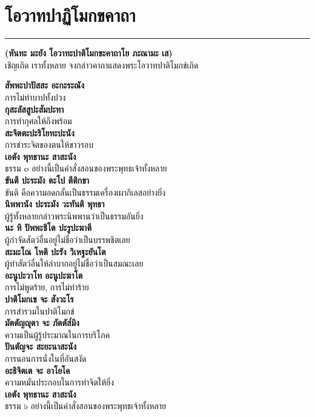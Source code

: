 \documentclass[12pt]{article}
\begin{document}
\section{โอวาทปาฏิโมกขคาถา}
\hrule
\begin{center}
\textbf{(หันทะ มะยัง โอวาทะปาติโมกขะคาถาโย ภะณามะ เส)}\\
เชิญเถิด เราทั้งหลาย จงกล่าวคาถาแสดงพระโอวาทปาติโมกข์เถิด
\end{center}
\textbf{สัพพะปาปัสสะ อะกะระณัง}\\
\indent การไม่ทำบาปทั้งปวง\\
\textbf{กุสะลัสสูปะสัมปะทา}\\
\indent การทำกุศลให้ถึงพร้อม\\
\textbf{สะจิตตะปะริโยทะปะนัง}\\
\indent การชำระจิตของตนให้ขาวรอบ\\
\textbf{เอตัง พุทธานะ สาสะนัง}\\
\indent ธรรม ๓ อย่างนี้เป็นคำสั่งสอนของพระพุทธเจ้าทั้งหลาย\\
\textbf{ขันตี ปะระมัง ตะโป ตีติกขา}\\
\indent ขันติ คือความอดกลั้นเป็นธรรมเครื่องเผากิเลสอย่างยิ่ง\\
\textbf{นิพพานัง ปะระมัง วะทันติ พุทธา}\\
\indent ผู้รู้ทั้งหลายกล่าวพระนิพพานว่าเป็นธรรมอันยิ่ง\\
\textbf{นะ หิ ปัพพะชิโต ปะรูปะฆาตี}\\
\indent ผู้กำจัดสัตว์อื่นอยู่ไม่ชื่อว่าเป็นบรรพชิตเลย\\
\textbf{สะมะโณ โหติ ปะรัง วิเหฐะยันโต}\\
\indent ผู้ทำสัตว์อื่นให้ลำบากอยู่ไม่ชื่อว่าเป็นสมณะเลย\\
\textbf{อะนูปะวาโท อะนูปะฆาโต}\\
\indent การไม่พูดร้าย, การไม่ทำร้าย\\
\textbf{ปาติโมกเข จะ สังวะโร}\\
\indent การสำรวมในปาติโมกข์\\
\textbf{มัตตัญญุตา จะ ภัตตัส๎มิง}\\
\indent ความเป็นผู้รู้ประมาณในการบริโภค\\
\textbf{ปันตัญจะ สะยะนาสะนัง}\\
\indent การนอนการนั่งในที่อันสงัด\\
\textbf{อะธิจิตเต จะ อาโยโค}\\
\indent ความหมั่นประกอบในการทำจิตให้ยิ่ง\\
\textbf{เอตัง พุทธานะ สาสะนัง}\\
\indent ธรรม ๖ อย่างนี้เป็นคำสั่งสอนของพระพุทธเจ้าทั้งหลาย\\
\end{document}
